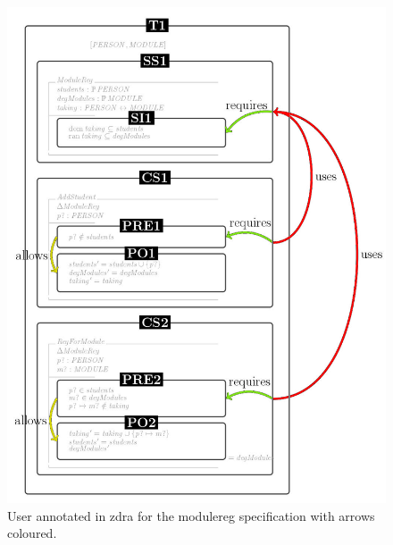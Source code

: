 \begin{figure}[H]
\centering
\includegraphics[scale=0.55]{Figures/Formalising/dramodule.png}
\caption{User annotated in \gls{zdra} for the modulereg specification with arrows coloured. \label{fig:zdramodule}}
\end{figure}

